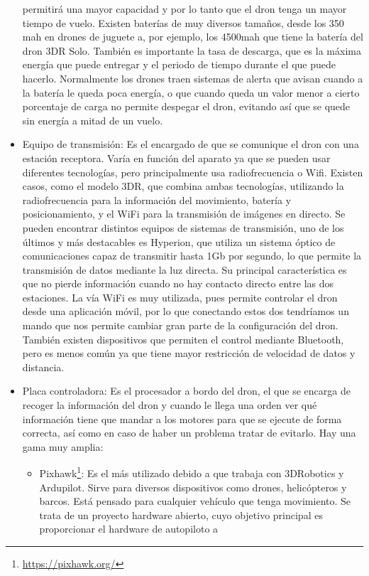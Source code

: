 \begin{itemize}
permitirá una mayor capacidad y por lo tanto que el dron tenga un mayor tiempo
de vuelo. Existen baterías de muy diversos tamaños, desde los 350 mah en drones de
juguete a, por ejemplo, los 4500mah que tiene la batería del dron 3DR Solo. También
es importante la tasa de descarga, que es la máxima energía que puede entregar y el
periodo de tiempo durante el que puede hacerlo. Normalmente los drones traen sistemas
de alerta que avisan cuando a la batería le queda poca energía, o que cuando queda
un valor menor a cierto porcentaje de carga no permite despegar el dron, evitando así
que se quede sin energía a mitad de un vuelo.
\item Equipo de transmisión: Es el encargado de que se comunique el dron con
una estación receptora. Varía en función del aparato ya que se pueden usar
diferentes tecnologías, pero principalmente usa radiofrecuencia o Wifi. Existen casos,
como el modelo 3DR, que combina ambas tecnologías, utilizando la radiofrecuencia
para la información del movimiento, batería y posicionamiento, y el WiFi para la
transmisión de imágenes en directo. Se pueden encontrar distintos equipos de sistemas
de transmisión, uno de los últimos y más destacables es Hyperion, que utiliza un
sistema óptico de comunicaciones capaz de transmitir hasta 1Gb por segundo, lo que
permite la transmisión de datos mediante la luz directa. Su principal característica
es que no pierde información cuando no hay contacto directo entre las dos estaciones.
La vía WiFi es muy utilizada, pues permite controlar el dron desde una aplicación
móvil, por lo que conectando estos dos tendríamos un mando que nos permite cambiar
gran parte de la configuración del dron. También existen dispositivos que permiten
el control mediante Bluetooth, pero es menos común ya que tiene mayor restricción de
velocidad de datos y distancia.
\item Placa controladora: Es el procesador a bordo del dron, el que se encarga de recoger
la información del dron y cuando le llega una orden ver qué información tiene que
mandar a los motores para que se ejecute de forma correcta, así como en caso de haber un
problema tratar de evitarlo. Hay una gama muy amplia:
	\begin{itemize}
	\item Pixhawk\footnote{\url{https://pixhawk.org/}}: Es el más utilizado debido a que trabaja con 3DRobotics y Ardupilot.
Sirve para diversos dispositivos como drones, helicópteros y barcos. Está pensado
para cualquier vehículo que tenga movimiento. Se trata de un proyecto hardware
abierto, cuyo objetivo principal es proporcionar el hardware de autopiloto a

\end{itemize}
\end{itemize}
